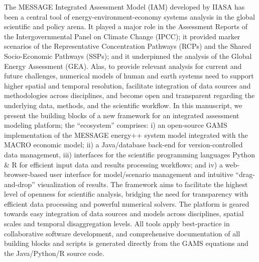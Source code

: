 The MESSAGE Integrated Assessment Model (IAM) developed by IIASA has been a central tool of energy-environment-economy systems analysis in the global scientific and policy arena. It played a major role in the Assessment Reports of the Intergovernmental Panel on Climate Change (IPCC); it provided marker scenarios of the Representative Concentration Pathways (RCPs) and the Shared Socio-Economic Pathways (SSPs); and it underpinned the analysis of the Global Energy Assessment (GEA). Alas, to provide relevant analysis for current and future challenges, numerical models of human and earth systems need to support higher spatial and temporal resolution, facilitate integration of data sources and methodologies across disciplines, and become open and transparent regarding the underlying data, methods, and the scientific workflow. In this manuscript, we present the building blocks of a new framework for an integrated assessment modeling platform; the “ecosystem” comprises: i) an open-source GAMS implementation of the MESSAGE energy++ system model integrated with the MACRO economic model; ii) a Java/database back-end for version-controlled data management, iii) interfaces for the scientific programming languages Python & R for efficient input data and results processing workflows; and iv) a web-browser-based user interface for model/scenario management and intuitive “drag-and-drop” visualization of results. The framework aims to facilitate the highest level of openness for scientific analysis, bridging the need for transparency with efficient data processing and powerful numerical solvers. The platform is geared towards easy integration of data sources and models across disciplines, spatial scales and temporal disaggregation levels. All tools apply best-practice in collaborative software development, and comprehensive documentation of all building blocks and scripts is generated directly from the GAMS equations and the Java/Python/R source code.
